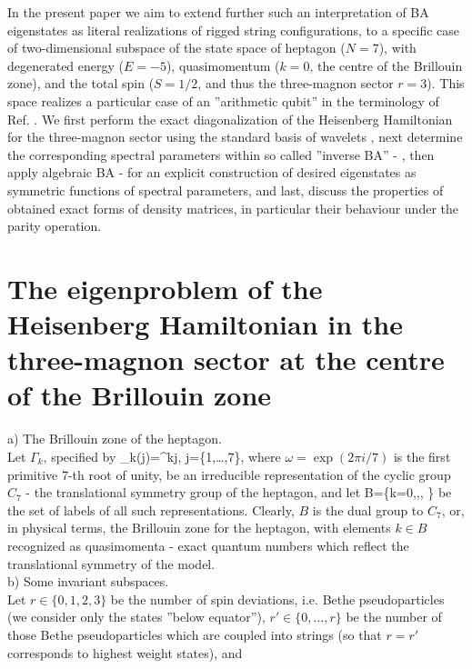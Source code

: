 \documentclass{elsarticle}
\begin{document}
In the present paper we aim to extend further such an interpretation of BA eigenstates as literal realizations of rigged string configurations, to a specific case of two-dimensional subspace of the state space of heptagon ($N=7$), with degenerated energy ($E=-5$), quasimomentum ($k=0$, the centre of the Brillouin zone), and the total spin ($S=1/2$, and thus the three-magnon sector $r=3$). This space realizes a particular case of an ''arithmetic qubit'' in the terminology of Ref. \cite{mblls}. We first perform the exact diagonalization of the Heisenberg Hamiltonian for the three-magnon sector using the standard basis of wavelets \cite{llwj}, next determine the corresponding spectral parameters within so called ''inverse BA'' \cite{mblls} - \cite{llwj}, then apply algebraic BA \cite{faddeevrus} - \cite{fadd} for an explicit construction of desired eigenstates as symmetric functions of spectral parameters, and last, discuss the properties of obtained exact forms of density matrices, in particular their behaviour under the parity operation.

\section{The eigenproblem of the Heisenberg Hamiltonian in the three-magnon sector at the centre of the Brillouin zone}

a) The Brillouin zone of the heptagon.\\

Let $\Gamma_k$, specified by 
\be
\Gamma_k(j)=\omega^{kj}, \quad j\in {}=\{1,\ldots,7\},
\ee
where $\omega=\exp(2\pi i/7)$ is the first primitive 7-th root of unity, be an irreducible representation of the cyclic group $C_7$ - the translational symmetry group of the heptagon, and let
\be
B=\{k=0,,, \}
\ee
be the set of labels of all such representations. Clearly, $B$ is the dual group to $C_7$, or, in physical terms, the Brillouin zone for the heptagon, with elements $k\in B$ recognized as quasimomenta - exact quantum numbers which reflect the translational symmetry of the model.\\

b) Some invariant subspaces.\\

Let $r\in \{0,1,2,3\}$ be the number of spin deviations, i.e. Bethe pseudoparticles (we consider only the states ''below equator''), $r'\in\{0,\ldots,r\}$ be the number of those Bethe pseudoparticles which are coupled into strings (so that $r=r'$ corresponds to highest weight states), and
\end{document}
